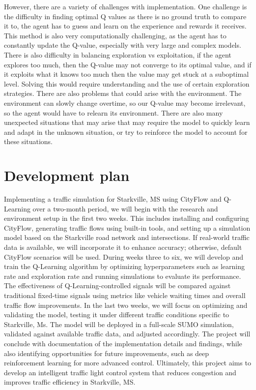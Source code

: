 \documentclass[conference]{IEEEtran}
\begin{document}
However, there are a variety of challenges with implementation. One challenge is the difficulty in finding optimal Q values as there is no ground truth to compare it to, the agent has to guess and learn on the experience and rewards it receives. This method is also very computationally challenging, as the agent has to constantly update the Q-value, especially with very large and complex models. There is also difficulty in balancing exploration vs exploitation, if the agent explores too much, then the Q-value may not converge to its optimal value, and if it exploits what it knows too much then the value may get stuck at a suboptimal level. Solving this would require understanding and the use of certain exploration strategies. There are also problems that could arise with the environment. The environment can slowly change overtime, so our Q-value may become irrelevant, so the agent would have to relearn its environment. There are also many unexpected situations that may arise that may require the model to quickly learn and adapt in the unknown situation, or try to reinforce the model to account for these situations.

\section{Development plan}

Implementing a traffic simulation for Starkville, MS using CityFlow and Q-Learning over a two-month period, we will begin with the research and environment setup in the first two weeks. This includes installing and configuring CityFlow, generating traffic flows using built-in tools, and setting up a simulation model based on the Starkville road network and intersections. If real-world traffic data is available, we will incorporate it to enhance accuracy; otherwise, default CityFlow scenarios will be used. During weeks three to six, we will develop and train the Q-Learning algorithm by optimizing hyperparameters such as learning rate and exploration rate and running simulations to evaluate its performance. The effectiveness of Q-Learning-controlled signals will be compared against traditional fixed-time signals using metrics like vehicle waiting times and overall traffic flow improvements. In the last two weeks, we will focus on optimizing and validating the model, testing it under different traffic conditions specific to Starkville, Ms. The model will be deployed in a full-scale SUMO simulation, validated against available traffic data, and adjusted accordingly. The project will conclude with documentation of the implementation details and findings, while also identifying opportunities for future improvements, such as deep reinforcement learning for more advanced control. Ultimately, this project aims to develop an intelligent traffic light control system that reduces congestion and improves traffic efficiency in Starkville, MS. 
\end{document}
